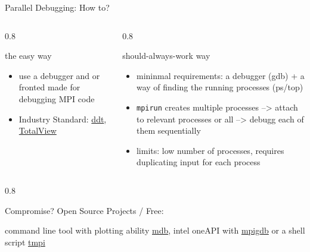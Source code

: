 \documentclass[aspectratio=1610]{beamer}
\newenvironment{centeredblock}[2][0.8\textwidth]
{ %
	\begin{center}
		\begin{varwidth}{#1} %
			\begin{block}{#2}
				\centering
			}
			{ %
			\end{block}
		\end{varwidth}
	\end{center}
}
\begin{document}
	\begin{frame}[fragile]{Parallel Debugging: How to?}
			\begin{columns}
				\hfill
				\begin{column}{0.3\textwidth}
					\begin{centeredblock}{the easy way}
						\begin{itemize}
							\item use a debugger and or fronted made for debugging MPI code
							\item Industry Standard: \href{https://www.linaroforge.com/}{ddt}\footnotemark, \href{https://totalview.io/}{TotalView}\footnotemark[1]
						\end{itemize}
					\end{centeredblock}
				\end{column}
				\hfill
				\begin{column}{0.7\textwidth}
					\begin{centeredblock}{should-always-work way}
						\begin{itemize}
							\item mininmal requirements: a debugger (gdb) + a way of finding the running processes (ps/top)
							\item \texttt{mpirun} creates multiple processes --> attach to relevant processes or all --> debugg each of them sequentially
							\item limits: low number of processes, requires duplicating input for each process
						\end{itemize}
					\end{centeredblock}
				\end{column}
				\hfill
			\end{columns}
		
		\begin{centeredblock}{Compromise? Open Source Projects / Free:}
			command line tool with plotting ability \href{https://github.com/TomMelt/mdb?tab=readme-ov-file}{mdb}, intel oneAPI with \href{https://www.intel.com/content/www/us/en/docs/distribution-for-gdb/tutorial-debugging-dpcpp-linux/2024-1/debugging-mpi-programs.html}{mpigdb} or a shell script \href{https://github.com/Azrael3000/tmpi}{tmpi}
		\end{centeredblock}

		
	\end{frame}
	
\end{document}
